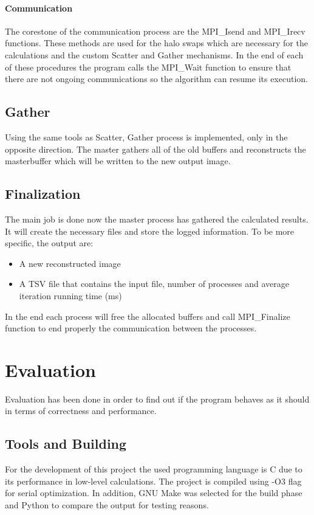 \documentclass[12pt,a4paper]{article}
\newcommand{\sectionVspacing}{\vspace{15pt}}
\begin{document}
        \paragraph{Communication}
            The corestone of the communication process are the MPI\_Isend and MPI\_Irecv functions. These methods are used for the halo swaps which are necessary for the calculations and the custom Scatter and Gather mechanisms. In the end of each of these procedures the program calls the MPI\_Wait function to ensure that there are not ongoing communications so the algorithm can resume its execution.

    \subsection{Gather}
    	Using the same tools as Scatter, Gather process is implemented, only in the opposite direction. The master gathers all of the old buffers and reconstructs the masterbuffer which will be written to the new output image.

    \subsection{Finalization}
    	The main job is done now the master process has gathered the calculated results. It will create the necessary files and store the logged information. To be more specific, the output are:

        \begin{itemize}
		  \item A new reconstructed image
		  \item A TSV file that contains the input file, number of processes and average iteration running time (ms)
		\end{itemize}

    	In the end each process will free the allocated buffers and call MPI\_Finalize function to end properly the communication between the processes.

\sectionVspacing
\clearpage

\section{Evaluation}
    Evaluation has been done in order to find out if the program behaves as it should in terms of correctness and performance.

    \subsection{Tools and Building}
        For the development of this project the used programming language is C due to its performance in low-level calculations. The project is compiled using -O3 flag for serial optimization. In addition, GNU Make was selected for the build phase and Python to compare the output for testing reasons.
        
\end{document}

